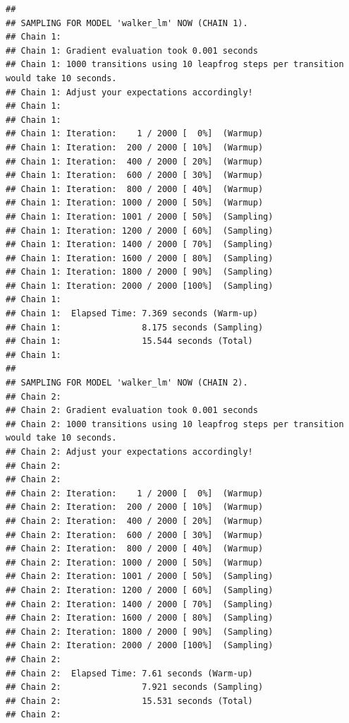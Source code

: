 \documentclass[
]{book}
\newenvironment{Shaded}{\begin{snugshade}}{\end{snugshade}}
\newcommand{\AttributeTok}[1]{\textcolor[rgb]{0.77,0.63,0.00}{#1}}
\newcommand{\CommentTok}[1]{\textcolor[rgb]{0.56,0.35,0.01}{\textit{#1}}}
\newcommand{\FloatTok}[1]{\textcolor[rgb]{0.00,0.00,0.81}{#1}}
\newcommand{\FunctionTok}[1]{\textcolor[rgb]{0.00,0.00,0.00}{#1}}
\newcommand{\NormalTok}[1]{#1}
\newcommand{\SpecialCharTok}[1]{\textcolor[rgb]{0.00,0.00,0.00}{#1}}
\newcommand{\StringTok}[1]{\textcolor[rgb]{0.31,0.60,0.02}{#1}}
\begin{document}
\begin{verbatim}
## 
## SAMPLING FOR MODEL 'walker_lm' NOW (CHAIN 1).
## Chain 1: 
## Chain 1: Gradient evaluation took 0.001 seconds
## Chain 1: 1000 transitions using 10 leapfrog steps per transition would take 10 seconds.
## Chain 1: Adjust your expectations accordingly!
## Chain 1: 
## Chain 1: 
## Chain 1: Iteration:    1 / 2000 [  0%]  (Warmup)
## Chain 1: Iteration:  200 / 2000 [ 10%]  (Warmup)
## Chain 1: Iteration:  400 / 2000 [ 20%]  (Warmup)
## Chain 1: Iteration:  600 / 2000 [ 30%]  (Warmup)
## Chain 1: Iteration:  800 / 2000 [ 40%]  (Warmup)
## Chain 1: Iteration: 1000 / 2000 [ 50%]  (Warmup)
## Chain 1: Iteration: 1001 / 2000 [ 50%]  (Sampling)
## Chain 1: Iteration: 1200 / 2000 [ 60%]  (Sampling)
## Chain 1: Iteration: 1400 / 2000 [ 70%]  (Sampling)
## Chain 1: Iteration: 1600 / 2000 [ 80%]  (Sampling)
## Chain 1: Iteration: 1800 / 2000 [ 90%]  (Sampling)
## Chain 1: Iteration: 2000 / 2000 [100%]  (Sampling)
## Chain 1: 
## Chain 1:  Elapsed Time: 7.369 seconds (Warm-up)
## Chain 1:                8.175 seconds (Sampling)
## Chain 1:                15.544 seconds (Total)
## Chain 1: 
## 
## SAMPLING FOR MODEL 'walker_lm' NOW (CHAIN 2).
## Chain 2: 
## Chain 2: Gradient evaluation took 0.001 seconds
## Chain 2: 1000 transitions using 10 leapfrog steps per transition would take 10 seconds.
## Chain 2: Adjust your expectations accordingly!
## Chain 2: 
## Chain 2: 
## Chain 2: Iteration:    1 / 2000 [  0%]  (Warmup)
## Chain 2: Iteration:  200 / 2000 [ 10%]  (Warmup)
## Chain 2: Iteration:  400 / 2000 [ 20%]  (Warmup)
## Chain 2: Iteration:  600 / 2000 [ 30%]  (Warmup)
## Chain 2: Iteration:  800 / 2000 [ 40%]  (Warmup)
## Chain 2: Iteration: 1000 / 2000 [ 50%]  (Warmup)
## Chain 2: Iteration: 1001 / 2000 [ 50%]  (Sampling)
## Chain 2: Iteration: 1200 / 2000 [ 60%]  (Sampling)
## Chain 2: Iteration: 1400 / 2000 [ 70%]  (Sampling)
## Chain 2: Iteration: 1600 / 2000 [ 80%]  (Sampling)
## Chain 2: Iteration: 1800 / 2000 [ 90%]  (Sampling)
## Chain 2: Iteration: 2000 / 2000 [100%]  (Sampling)
## Chain 2: 
## Chain 2:  Elapsed Time: 7.61 seconds (Warm-up)
## Chain 2:                7.921 seconds (Sampling)
## Chain 2:                15.531 seconds (Total)
## Chain 2:
\end{verbatim}

\begin{Shaded}
\end{Shaded}
\end{document}
